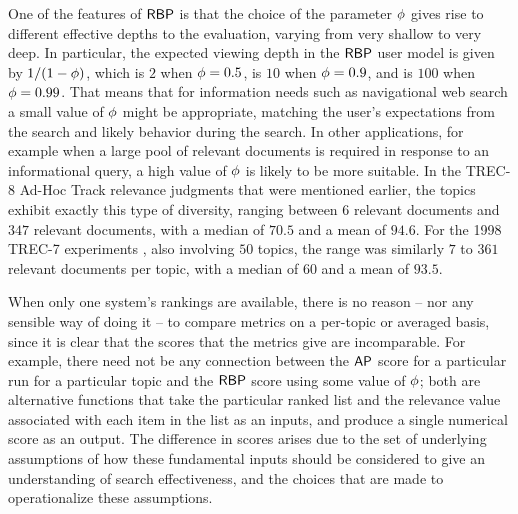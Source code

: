 One of the features of ${\mbox{\sf{RBP}}}$ is that the choice of the parameter
$\mbox{$\phi$}$ gives rise to different effective depths to the evaluation,
varying from very shallow to very deep.
In particular, the expected viewing depth in the ${\mbox{\sf{RBP}}}$ user model is
given by $1/(1-\mbox{$\phi$})$, which is $2$ when $\mbox{$\phi$}=0.5$, is $10$ when
$\mbox{$\phi$}=0.9$, and is $100$ when $\mbox{$\phi$}=0.99$.
That means that for information needs such as navigational web search
a small value of $\mbox{$\phi$}$ might be appropriate, matching the user's
expectations from the search and likely behavior during the search.
In other applications, for example when a large pool of relevant documents is
required in response to an informational query, a high value of
$\mbox{$\phi$}$ is likely to be more suitable.
In the TREC-8 Ad-Hoc Track relevance judgments that were mentioned
earlier, the topics exhibit exactly this type of diversity, ranging
between $6$ relevant documents and $347$ relevant documents, with a
median of $70.5$ and a mean of $94.6$.
For the 1998 TREC-7 experiments {\citep{vh98trec}}, also involving
$50$ topics, the range was similarly $7$ to $361$ relevant documents
per topic, with a median of $60$ and a mean of $93.5$.


When only one system's rankings are available, there is no reason --
nor any sensible way of doing it -- to compare metrics on a per-topic
or averaged basis, since it is clear that the scores that the metrics
give are incomparable.
For example, there need not be any connection between the ${\mbox{\sf{AP}}}$ score
for a particular run for a particular topic and the ${\mbox{\sf{RBP}}}$ score using
some value of $\mbox{$\phi$}$; both are alternative functions that take the
particular ranked list and the relevance value associated with each
item in the list as an inputs, and produce a single numerical score as
an output.
The difference in scores arises due to the set of underlying
assumptions of how these fundamental inputs should be considered to
give an understanding of search effectiveness, and the choices that are
made to operationalize these assumptions.

